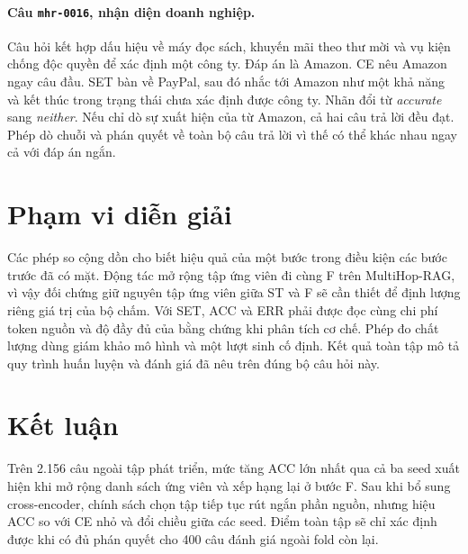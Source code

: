 \paragraph{Câu \texttt{mhr-0016}, nhận diện doanh nghiệp.}
Câu hỏi kết hợp dấu hiệu về máy đọc sách, khuyến mãi theo thư mời và vụ kiện chống độc quyền để xác định một công ty. Đáp án là Amazon. CE nêu Amazon ngay câu đầu. SET bàn về PayPal, sau đó nhắc tới Amazon như một khả năng và kết thúc trong trạng thái chưa xác định được công ty. Nhãn đổi từ \emph{accurate} sang \emph{neither}. Nếu chỉ dò sự xuất hiện của từ Amazon, cả hai câu trả lời đều đạt. Phép dò chuỗi và phán quyết về toàn bộ câu trả lời vì thế có thể khác nhau ngay cả với đáp án ngắn.

\section{Phạm vi diễn giải}
Các phép so cộng dồn cho biết hiệu quả của một bước trong điều kiện các bước trước đã có mặt. Động tác mở rộng tập ứng viên đi cùng F trên MultiHop-RAG, vì vậy đối chứng giữ nguyên tập ứng viên giữa ST và F sẽ cần thiết để định lượng riêng giá trị của bộ chấm. Với SET, ACC và ERR phải được đọc cùng chi phí token nguồn và độ đầy đủ của bằng chứng khi phân tích cơ chế. Phép đo chất lượng dùng giám khảo mô hình và một lượt sinh cố định. Kết quả toàn tập mô tả quy trình huấn luyện và đánh giá đã nêu trên đúng bộ câu hỏi này.

\section{Kết luận}
Trên 2.156 câu ngoài tập phát triển, mức tăng ACC lớn nhất qua cả ba seed xuất hiện khi mở rộng danh sách ứng viên và xếp hạng lại ở bước F. Sau khi bổ sung cross-encoder, chính sách chọn tập tiếp tục rút ngắn phần nguồn, nhưng hiệu ACC so với CE nhỏ và đổi chiều giữa các seed.
\ifFullResults\else
Điểm toàn tập sẽ chỉ xác định được khi có đủ phán quyết cho 400 câu đánh giá ngoài fold còn lại.
\fi
